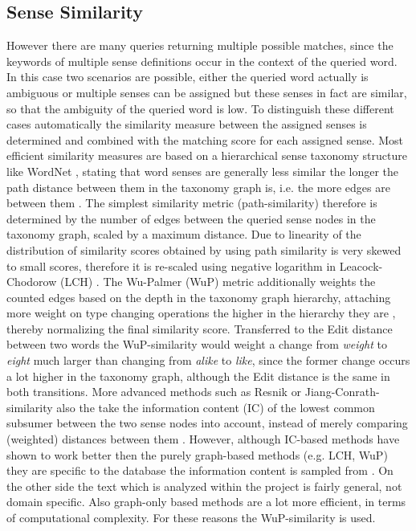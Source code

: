 \documentclass{custom_report}
\begin{document}
\subsection{Sense Similarity}
However there are many queries returning multiple possible matches, since the keywords of multiple sense definitions occur in the context of the queried word. In this case two scenarios are possible, either the queried word actually is ambiguous or multiple senses can be assigned but these senses in fact are similar, so that the ambiguity of the queried word is low. To distinguish these different cases automatically the similarity measure between the assigned senses is determined and combined with the matching score for each assigned sense. 
\newline 
Most efficient similarity measures are based on a hierarchical sense taxonomy structure like WordNet \cite{wordnet}, stating that word senses are generally less similar the longer the path distance between them in the taxonomy graph is, i.e. the more edges are between them \cite{speech_and_language_processing}. The simplest similarity metric (path-similarity) therefore is determined by the number of edges between the queried sense nodes in the taxonomy graph, scaled by a maximum distance. Due to linearity of the distribution of similarity scores obtained by using path similarity is very skewed to small scores, therefore it is re-scaled using negative logarithm in Leacock-Chodorow (LCH) \cite{lch_similarity}.
\newline 
The Wu-Palmer (WuP) metric \cite{wup_similarity} additionally weights the counted edges based on the depth in the taxonomy graph hierarchy, attaching more weight on type changing operations the higher in the hierarchy they are \cite{speech_and_language_processing}, thereby normalizing the final similarity score. Transferred to the Edit distance between two words \cite{edit_distance} the WuP-similarity would weight a change from \textit{weight} to \textit{eight} much larger than changing from \textit{alike} to \textit{like}, since the former change occurs a lot higher in the taxonomy graph, although the Edit distance is the same in both transitions.  
\newline 
More advanced methods such as Resnik \cite{resnik_similarity} or Jiang-Conrath-similarity \cite{jiang_similarity} also the take the information content (IC) of the lowest common subsumer between the two sense nodes into account, instead of merely comparing (weighted) distances between them \cite{nltk}. However, although IC-based methods have shown to work better then the purely graph-based methods (e.g. LCH, WuP) they are specific to the database the information content is sampled from \cite{speech_and_language_processing}. On the other side the text which is analyzed within the project is fairly general, not domain specific. Also graph-only based methods are a lot more efficient, in terms of computational complexity. For these reasons the WuP-similarity is used. 
\end{document}
